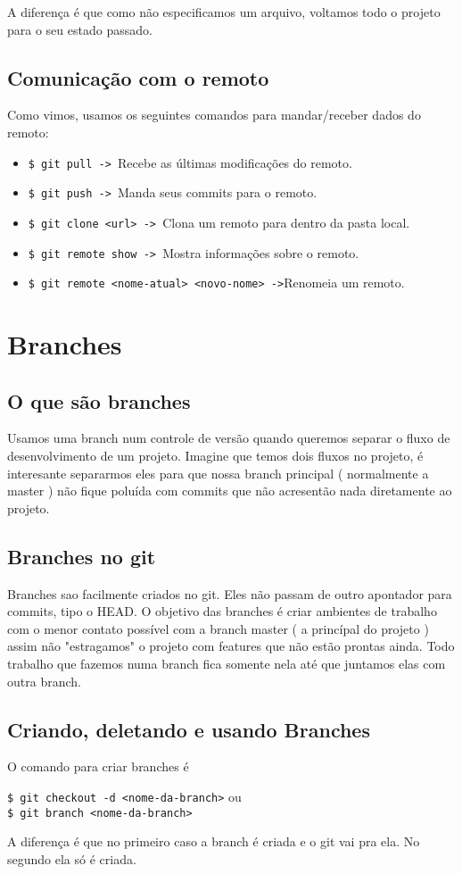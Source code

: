 \documentclass{article}
\begin{document}
    A diferença é que como não especificamos um arquivo, voltamos todo o projeto
para o seu estado passado.
\subsection{Comunicação com o remoto}
    Como vimos, usamos os seguintes comandos para mandar/receber dados do remoto:
    \begin{itemize}
        \item \verb#$ git pull -> #Recebe as últimas modificações do remoto.
        \item \verb#$ git push -> #Manda seus commits para o remoto.
        \item \verb#$ git clone <url> -> #Clona um remoto para dentro da pasta local.
        \item \verb#$ git remote show -> #Mostra informações sobre o remoto.
        \item \verb#$ git remote <nome-atual> <novo-nome> ->#Renomeia um remoto.
    \end{itemize}

\section{Branches}

\subsection{O que são branches}
    Usamos uma branch num controle de versão quando queremos separar o fluxo de desenvolvimento
de um projeto. Imagine que temos dois fluxos no projeto, é interesante separarmos eles para que
nossa branch principal ( normalmente a master ) não fique poluída com commits que não acresentão
nada diretamente ao projeto.

\subsection{Branches no git}
    Branches sao facilmente criados no git. Eles não passam de outro apontador para 
commits, tipo o HEAD. O objetivo das branches é criar ambientes de trabalho com o
menor contato possível com a branch master ( a princípal do projeto ) assim
não "estragamos" o projeto com features que não estão prontas ainda. Todo trabalho
que fazemos numa branch fica somente nela até que juntamos elas com outra branch.

\subsection{Criando, deletando e usando Branches}
    O comando para criar branches é
\begin{tabbing}
    \hspace{1cm}\=\verb#$ git checkout -d <nome-da-branch># ou\\
                \>\verb#$ git branch <nome-da-branch>#
\end{tabbing}
    A diferença é que no primeiro caso a branch é criada e o git vai pra ela. No segundo
ela só é criada.
\end{document}
